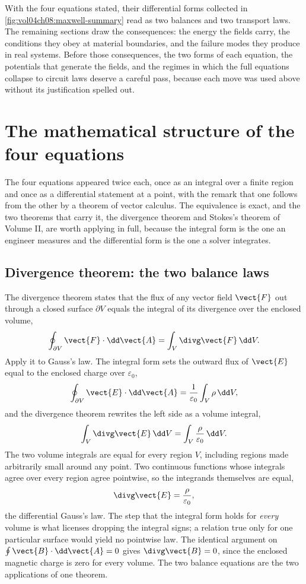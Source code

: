 

With the four equations stated, their differential forms collected in
\cref{fig:vol04ch08:maxwell-summary} read as two balances and two
transport laws. The remaining sections draw the consequences: the energy
the fields carry, the conditions they obey at material boundaries, and
the failure modes they produce in real systems. Before those
consequences, the two forms of each equation, the potentials that
generate the fields, and the regimes in which the full equations collapse
to circuit laws deserve a careful pass, because each move was used above
without its justification spelled out.

\section{The mathematical structure of the four equations}

The four equations appeared twice each, once as an integral over a finite
region and once as a differential statement at a point, with the remark
that one follows from the other by a theorem of vector calculus. The
equivalence is exact, and the two theorems that carry it, the divergence
theorem and Stokes's theorem of Volume II, are worth applying in full,
because the integral form is the one an engineer measures and the
differential form is the one a solver integrates.

\subsection{Divergence theorem: the two balance laws}

The divergence theorem states that the flux of any vector field
$\vect{F}$ out through a closed surface $\partial V$ equals the integral
of its divergence over the enclosed volume,
\[
\oint_{\partial V}\vect{F}\cdot\dd\vect{A} = \int_{V}\divg\vect{F}\,\dd V.
\]
Apply it to Gauss's law. The integral form sets the outward flux of
$\vect{E}$ equal to the enclosed charge over $\varepsilon_0$,
\[
\oint_{\partial V}\vect{E}\cdot\dd\vect{A} = \frac{1}{\varepsilon_0}
\int_{V}\rho\,\dd V,
\]
and the divergence theorem rewrites the left side as a volume integral,
\[
\int_{V}\divg\vect{E}\,\dd V = \int_{V}\frac{\rho}{\varepsilon_0}\,\dd V.
\]
The two volume integrals are equal for every region $V$, including
regions made arbitrarily small around any point. Two continuous functions
whose integrals agree over every region agree pointwise, so the
integrands themselves are equal,
\[
\divg\vect{E} = \frac{\rho}{\varepsilon_0},
\]
the differential Gauss's law. The step that the integral form holds for
\emph{every} volume is what licenses dropping the integral signs; a
relation true only for one particular surface would yield no pointwise
law. The identical argument on $\oint\vect{B}\cdot\dd\vect{A} = 0$ gives
$\divg\vect{B} = 0$, since the enclosed magnetic charge is zero for every
volume. The two balance equations are the two applications of one
theorem.

